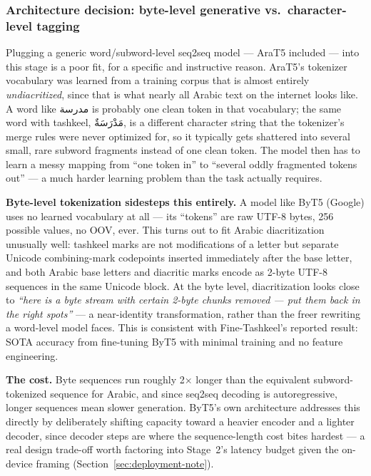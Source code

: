 \documentclass[11pt,a4paper]{article}
\begin{document}
\subsubsection{Architecture decision: byte-level generative vs.\ character-level tagging}
\label{sec:diacritization-arch}

Plugging a generic word/subword-level seq2seq model --- AraT5 included --- into
this stage is a poor fit, for a specific and instructive reason. AraT5's
tokenizer vocabulary was learned from a training corpus that is almost
entirely \emph{undiacritized}, since that is what nearly all Arabic text on
the internet looks like. A word like \textarabic{مدرسة} is probably one clean
token in that vocabulary; the same word with tashkeel,
\textarabic{مَدْرَسَةٌ}, is a different character string that the tokenizer's
merge rules were never optimized for, so it typically gets shattered into
several small, rare subword fragments instead of one clean token. The model
then has to learn a messy mapping from ``one token in'' to ``several oddly
fragmented tokens out'' --- a much harder learning problem than the task
actually requires.

\textbf{Byte-level tokenization sidesteps this entirely.} A model like ByT5
(Google) uses no learned vocabulary at all --- its ``tokens'' are raw UTF-8
bytes, 256 possible values, no OOV, ever. This turns out to fit Arabic
diacritization unusually well: tashkeel marks are not modifications of a
letter but separate Unicode combining-mark codepoints inserted immediately
after the base letter, and both Arabic base letters and diacritic marks
encode as 2-byte UTF-8 sequences in the same Unicode block. At the byte level,
diacritization looks close to \emph{``here is a byte stream with certain
2-byte chunks removed --- put them back in the right spots''} --- a
near-identity transformation, rather than the freer rewriting a word-level
model faces. This is consistent with Fine-Tashkeel's reported result: SOTA
accuracy from fine-tuning ByT5 with minimal training and no feature
engineering.

\textbf{The cost.} Byte sequences run roughly 2$\times$ longer than the
equivalent subword-tokenized sequence for Arabic, and since seq2seq decoding
is autoregressive, longer sequences mean slower generation. ByT5's own
architecture addresses this directly by deliberately shifting capacity toward
a heavier encoder and a lighter decoder, since decoder steps are where the
sequence-length cost bites hardest --- a real design trade-off worth factoring
into Stage~2's latency budget given the on-device framing (Section~\ref{sec:deployment-note}).
\end{document}
